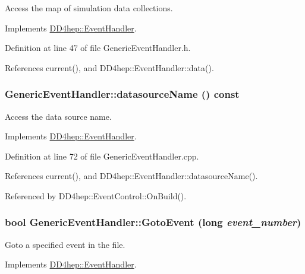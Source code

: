Access the map of simulation data collections. 

Implements \hyperlink{class_d_d4hep_1_1_event_handler_a263d136331d72994bcbf537d4aa16d4f}{DD4hep::EventHandler}.

Definition at line 47 of file GenericEventHandler.h.

References current(), and DD4hep::EventHandler::data().\hypertarget{class_d_d4hep_1_1_generic_event_handler_a9049182126476c4af50c72d15c120471}{
\subsubsection[{datasourceName}]{ GenericEventHandler::datasourceName () const}}
\label{class_d_d4hep_1_1_generic_event_handler_a9049182126476c4af50c72d15c120471}


Access the data source name. 

Implements \hyperlink{class_d_d4hep_1_1_event_handler_a5fa231363a787ba7edf520b5a99f294e}{DD4hep::EventHandler}.

Definition at line 72 of file GenericEventHandler.cpp.

References current(), and DD4hep::EventHandler::datasourceName().

Referenced by DD4hep::EventControl::OnBuild().\hypertarget{class_d_d4hep_1_1_generic_event_handler_a7a7c4d1592e5b2d467a426058aa1a44b}{
\subsubsection[{GotoEvent}]{\setlength{\rightskip}{0pt plus 5cm}bool GenericEventHandler::GotoEvent (long {\em event\_\-number})}}
\label{class_d_d4hep_1_1_generic_event_handler_a7a7c4d1592e5b2d467a426058aa1a44b}


Goto a specified event in the file. 

Implements \hyperlink{class_d_d4hep_1_1_event_handler_a09c40b0b753455c1e3df7c561ff6b069}{DD4hep::EventHandler}.

